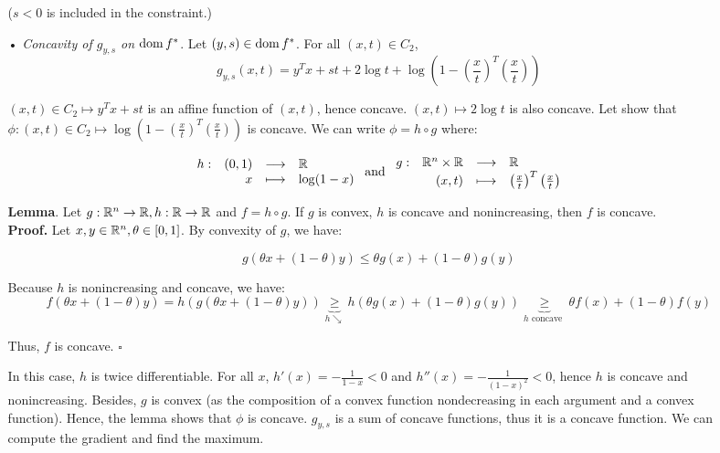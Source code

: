 \documentclass[a4paper, 11pt]{report}
\begin{document}
\begin{itemize}
\begin{itemize}
        ($s < 0$ is included in the constraint.)
        
        \item[•] \textit{Concavity of $g_{y, s}$ on $\operatorname{dom} f^{*}$}. Let $\left( y, s \right) \in \operatorname{dom} f^{*}$. For all $(x, t) \in C_{2}$, 
        \[ g_{y, s}(x, t) = y^{T}x + st +2 \log t + \log \left( 1 - \left( \frac{x}{t} \right)^{T} \left( \frac{x}{t} \right) \right)\]
        
        $\left( x, t \right) \in C_{2} \mapsto y^{T}x + st$ is an affine function of $\left( x, t \right)$, hence concave. $(x, t) \mapsto 2 \log t$ is also concave. Let show that $\phi: \left( x, t \right) \in C_{2} \mapsto \log \left( 1 - \left( \frac{x}{t} \right)^{T} \left( \frac{x}{t} \right) \right)$ is concave. We can write $\phi = h \circ g$ where:
        
        \[ \begin{array}{lrcl}
            h: & (0, 1) & \longrightarrow & \mathbb{R} \\
               & x      & \longmapsto     & \log(1 - x)
        \end{array} \text{  and  }
        \begin{array}{lrcl}
            g: & \mathbb{R}^{n} \times \mathbb{R} & \longrightarrow & \mathbb{R} \\
               & (x, t)        & \longmapsto     & \left( \frac{x}{t} \right)^{T} \left( \frac{x}{t} \right)
        \end{array} \]
        
        \textbf{Lemma}. Let $g: \mathbb{R}^{n} \rightarrow \mathbb{R}, h: \mathbb{R} \rightarrow \mathbb{R}$ and $f = h \circ g$. If $g$ is convex, $h$ is concave and nonincreasing, then $f$ is concave. \\
        \textbf{Proof.} Let $x, y \in \mathbb{R}^{n}, \theta \in [0, 1]$. By convexity of $g$, we have:
        
        \[ g \left( \theta x + (1 - \theta)y \right) \leq \theta g(x) + (1 - \theta)g(y) \]
        
        Because $h$ is nonincreasing and concave, we have:
        \[ f \left( \theta x + (1 - \theta)y \right) = h \left( g \left( \theta x + (1 - \theta)y \right) \right) \underbrace{\geq}_{h \searrow} h \left( \theta g(x) + (1 - \theta)g(y) \right) \underbrace{\geq}_{h \text{ concave }} \theta f(x) + (1 - \theta) f(y) \]
        
        Thus, $f$ is concave. \hfill $\square$
        
        In this case, $h$ is twice differentiable. For all $x$, $h'(x) = - \frac{1}{1 - x} < 0$ and $h''(x) = - \frac{1}{\left( 1 - x \right)^{2}} < 0$, hence $h$ is concave and nonincreasing. Besides, $g$ is convex (as the composition of a convex function nondecreasing in each argument and a convex function). Hence, the lemma shows that $\phi$ is concave. $g_{y, s}$ is a sum of concave functions, thus it is a concave function. We can compute the gradient and find the maximum.
        

\end{itemize}
\end{itemize}
\end{document}
